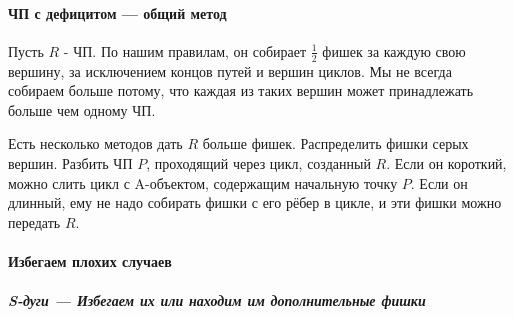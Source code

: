 \paragraph{ЧП с дефицитом --- общий метод}
Пусть $R$ - ЧП. По нашим правилам, он собирает $\frac{1}{2}$ фишек за каждую свою вершину, за исключением концов путей и вершин циклов. Мы не всегда собираем больше потому, что каждая из таких вершин может принадлежать больше чем одному ЧП.

Есть несколько методов дать $R$ больше фишек.
Распределить фишки серых вершин.
Разбить ЧП $P$, проходящий через цикл, созданный $R$. Если он короткий, можно слить цикл с A-объектом, содержащим начальную точку $P$. Если он длинный, ему не надо собирать фишки с его рёбер в цикле, и эти фишки можно передать $R$.

\paragraph{Избегаем плохих случаев}
\subparagraph{S-дуги --- Избегаем их или находим им дополнительные фишки}

\begin{defn} \end{defn}



